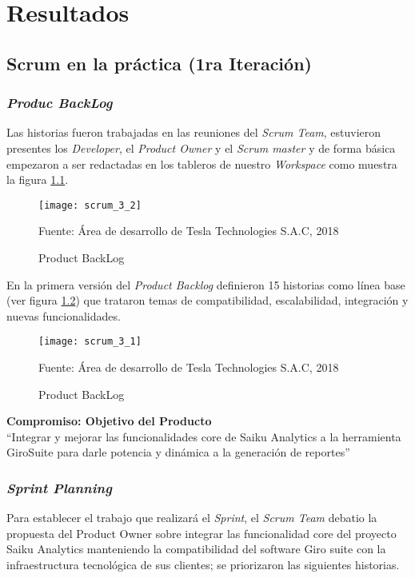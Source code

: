 \chapter{Resultados} \label{chapter:III}
\section{Scrum en la pr\'{a}ctica (1ra Iteraci\'{o}n)}
\begin{spacing}{1.5}
	\subsection{\textit{Produc BackLog}}
	Las historias fueron trabajadas en las reuniones del \textit{Scrum Team}, estuvieron presentes los \textit{Developer}, el \textit{Product Owner} y el \textit{Scrum master} y de forma b\'{a}sica empezaron a ser redactadas en los tableros de nuestro \textit{Workspace} como muestra la figura \ref{figure:chaperIII_1}.
	
	\begin{figure}[H]
		\centering
		\texttt{[image: scrum\_3\_2]}
		\caption {\centering \small{Product BackLog}} \label{figure:chaperIII_1}
		\small {Fuente: \'{A}rea de desarrollo de Tesla Technologies S.A.C, 2018}
	\end{figure}
	
	En la primera versi\'{o}n del \textit{Product Backlog} definieron 15 historias como l\'{i}nea base (ver figura \ref{figure:chaperIII_2}) que trataron temas de compatibilidad, escalabilidad, integraci\'{o}n y nuevas funcionalidades.

	\begin{figure}[H]
		\centering
		\texttt{[image: scrum\_3\_1]}
		\caption {\centering \small{Product BackLog}} \label{figure:chaperIII_2}
		\small {Fuente: \'{A}rea de desarrollo de Tesla Technologies S.A.C, 2018}
	\end{figure}
	\textbf{Compromiso: Objetivo del Producto}\\
	``Integrar y mejorar las funcionalidades core de Saiku Analytics a la herramienta GiroSuite para darle potencia y din\'{a}mica a la generaci\'{o}n de reportes''\\
	
	\subsection{\textit{Sprint Planning}}
	Para establecer el trabajo que realizar\'{a} el \textit{Sprint}, el \textit{Scrum Team} debatio la propuesta del Product Owner sobre integrar las funcionalidad core del proyecto Saiku Analytics manteniendo la compatibilidad del software Giro suite con la infraestructura tecnol\'{o}gica de sus clientes; se priorizaron las siguientes historias.
	

\end{spacing}
